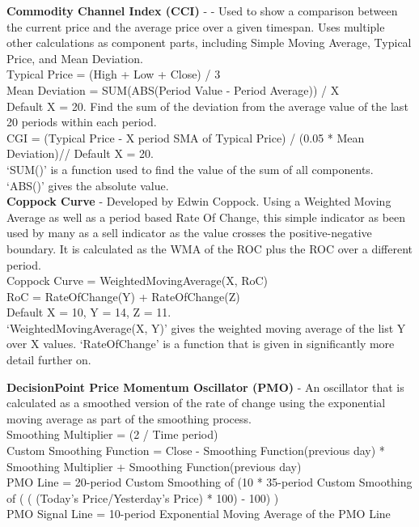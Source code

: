\documentclass[conference]{IEEEtran}
\begin{document}

\noindent
\textbf{Commodity Channel Index (CCI)} - \cite{Lambert1980} - Used to show a comparison between the current price and the average price over a given timespan. Uses multiple other calculations as component parts, including Simple Moving Average, Typical Price, and Mean Deviation.\\

\noindent
Typical Price = (High + Low + Close) / 3\\

\noindent
Mean Deviation = SUM(ABS(Period Value - Period Average)) / X\\
Default X = 20. Find the sum of the deviation from the average value of the last 20 periods within each period. \\

\noindent
CGI = (Typical Price - X period SMA of Typical Price) / (0.05 * Mean Deviation)//
Default X = 20.\\

`SUM()' is a function used to find the value of the sum of all components. `ABS()' gives the absolute value.\\

\noindent
\textbf{Coppock Curve} - Developed by Edwin Coppock. Using a Weighted Moving Average as well as a period based Rate Of Change, this simple indicator as been used by many as a sell indicator as the value crosses the positive-negative boundary. It is calculated as the WMA of the ROC plus the ROC over a different period.\\

\noindent
Coppock Curve = WeightedMovingAverage(X, RoC)\\
RoC = RateOfChange(Y) + RateOfChange(Z)\\
Default X = 10, Y = 14, Z = 11. \\

`WeightedMovingAverage(X, Y)' gives the weighted moving average of the list Y over X values. `RateOfChange' is a function that is given in significantly more detail further on.

\noindent
\textbf{DecisionPoint Price Momentum Oscillator (PMO)} - An oscillator that is calculated as a smoothed version of the rate of change using the exponential moving average as part of the smoothing process. \\

\noindent
Smoothing Multiplier = (2 / Time period)\\
Custom Smoothing Function = {Close - Smoothing Function(previous day)} * Smoothing Multiplier + Smoothing Function(previous day) \\
PMO Line = 20-period Custom Smoothing of (10 * 35-period Custom Smoothing of ( ( (Today's Price/Yesterday's Price) * 100) - 100) )\\
PMO Signal Line = 10-period Exponential Moving Average of the PMO Line\\
\end{document}
